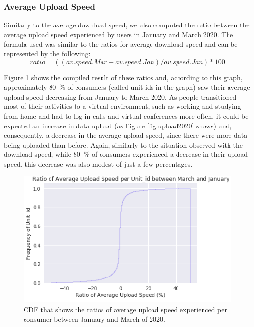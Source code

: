 \documentclass[conference]{IEEEtran}
\begin{document}
\subsubsection{Average Upload Speed}
\label{sec:average-upload-speed}
Similarly to the average download speed, we  also computed the ratio between the average upload speed experienced by users in January and March 2020. The formula used was similar to the ratios for average download speed and can be represented by the following: 
\begin{equation}
ratio= ((av.speed.Mar - av.speed.Jan)/ av.speed.Jan)*100    
\end{equation}

Figure \ref{fig:uploadspeed2020} shows the compiled result of these ratios and, according to this graph, approximately \SI{80}{\percent} of consumers (called unit-ids in the graph) saw their average upload speed decreasing from January to March 2020. As people transitioned most of their activities to a virtual environment, such as working and studying from home and had to log in calls and virtual conferences more often, it could be expected an increase in data upload (as Figure \ref{fig:upload2020} shows) and, consequently, a decrease in the average upload speed, since there were more data being uploaded than before. Again, similarly to the situation observed with the download speed, while \SI{80}{\percent} of consumers experienced a decrease in their upload speed, this decrease was also modest of just a few percentages. 

\begin{figure}[h!]
\centering
\includegraphics[width=1.0\linewidth]{uploadspeed.PNG}
\caption{CDF that shows the ratios of average upload speed experienced per consumer between January and March of 2020.}
\label{fig:uploadspeed2020}
\end{figure}
\end{document}

